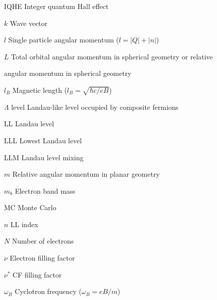 \begin{abbrv}
\item[IQHE] \hspace*{4.5mm} Integer quantum Hall effect
\item[$k$] \hspace*{4.5mm} Wave vector
\item[$l$] \hspace*{4.5mm} Single particle angular momentum ($l=|Q|+|n|$) 
\vspace{-18pt}
\begin{singlespace} 
    \item[$L$] \hspace*{4.5mm} Total orbital angular momentum in spherical geometry or relative 
    \item[] \hspace*{4.5mm} angular momentum in spherical geometry
\end{singlespace}
\item[$l_B$] \hspace*{4.5mm} Magnetic length ($l_B=\sqrt{\hbar c/eB}$)
\item[$\Lambda$ level] \hspace*{4.5mm} Landau-like level occupied by composite fermions
\item[LL] \hspace*{4.5mm} Landau level
\item[LLL] \hspace*{4.5mm} Lowest Landau level
\item[LLM] \hspace*{4.5mm} Landau level mixing
\item[$m$] \hspace*{4.5mm} Relative angular momentum in planar geometry
\item[$m_b$] \hspace*{4.5mm} Electron band mass
\item[MC] \hspace*{4.5mm} Monte Carlo
\item[$n$] \hspace*{4.5mm} LL index
\item[$N$] \hspace*{4.5mm} Number of electrons
\item[$\nu$] \hspace*{4.5mm} Electron filling factor
\item[$\nu^*$] \hspace*{4.5mm} CF filling factor
\item[$\omega_B$] \hspace*{4.5mm} Cyclotron frequency ($\omega_B=eB/m$)

\end{abbrv}
